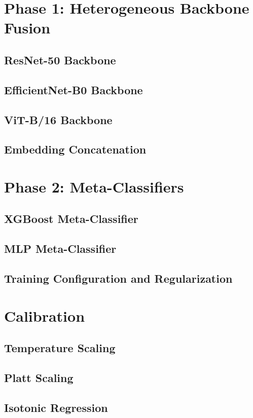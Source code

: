 \section{Phase 1: Heterogeneous Backbone Fusion}\label{sec:fusion}
\subsection{ResNet-50 Backbone}
\subsection{EfficientNet-B0 Backbone}
\subsection{ViT-B/16 Backbone}
\subsection{Embedding Concatenation}

\section{Phase 2: Meta-Classifiers}\label{sec:meta-clf}
\subsection{XGBoost Meta-Classifier}
\subsection{MLP Meta-Classifier}
\subsection{Training Configuration and Regularization}

\section{Calibration}\label{sec:calibration}
\subsection{Temperature Scaling}
\subsection{Platt Scaling}
\subsection{Isotonic Regression}
